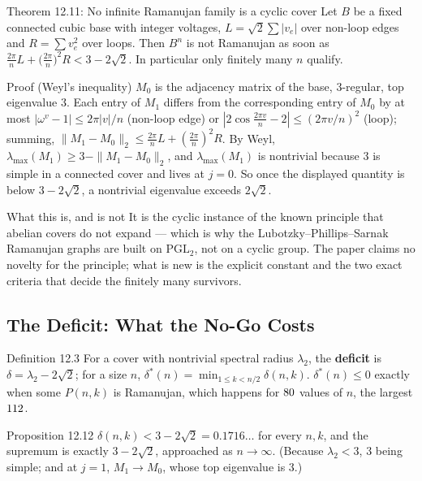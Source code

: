 \documentclass[11pt]{article}
\begin{document}
\begin{thmbox}{Theorem 12.11: No infinite Ramanujan family is a cyclic cover}
Let $B$ be a fixed connected cubic base with integer voltages, $L=\sqrt2\sum|v_e|$ over non-loop edges and $R=\sum v_e^2$ over loops. Then $B^n$ is not Ramanujan as soon as $\frac{2\pi}{n}L+\bigl(\frac{2\pi}{n}\bigr)^2R<3-2\sqrt2$. In particular only finitely many $n$ qualify.
\end{thmbox}

\begin{defbox}{Proof (Weyl's inequality)}
$M_0$ is the adjacency matrix of the base, $3$-regular, top eigenvalue $3$. Each entry of $M_1$ differs from the corresponding entry of $M_0$ by at most $|\omega^v-1|\le2\pi|v|/n$ (non-loop edge) or $|2\cos\frac{2\pi v}{n}-2|\le(2\pi v/n)^2$ (loop); summing, $\|M_1-M_0\|_2\le\frac{2\pi}{n}L+(\frac{2\pi}{n})^2R$. By Weyl, $\lambda_{\max}(M_1)\ge3-\|M_1-M_0\|_2$, and $\lambda_{\max}(M_1)$ is nontrivial because $3$ is simple in a connected cover and lives at $j=0$. So once the displayed quantity is below $3-2\sqrt2$, a nontrivial eigenvalue exceeds $2\sqrt2$. \qedhere
\end{defbox}

\begin{intubox}{What this is, and is not}
It is the cyclic instance of the known principle that abelian covers do not expand --- which is why the Lubotzky--Phillips--Sarnak Ramanujan graphs are built on $\mathrm{PGL}_2$, not on a cyclic group. The paper claims no novelty for the principle; what is new is the explicit constant and the two exact criteria that decide the finitely many survivors.
\end{intubox}

\subsection{The Deficit: What the No-Go Costs}

\begin{defbox}{Definition 12.3}
For a cover with nontrivial spectral radius $\lambda_2$, the \textbf{deficit} is $\delta=\lambda_2-2\sqrt2$; for a size $n$, $\delta^\ast(n)=\min_{1\le k<n/2}\delta(n,k)$. $\delta^\ast(n)\le0$ exactly when some $P(n,k)$ is Ramanujan, which happens for $80$ values of $n$, the largest $112$.
\end{defbox}

\begin{thmbox}{Proposition 12.12}
$\delta(n,k)<3-2\sqrt2=0.1716\ldots$ for every $n,k$, and the supremum is exactly $3-2\sqrt2$, approached as $n\to\infty$. (Because $\lambda_2<3$, $3$ being simple; and at $j=1$, $M_1\to M_0$, whose top eigenvalue is $3$.)
\end{thmbox}
\end{document}
